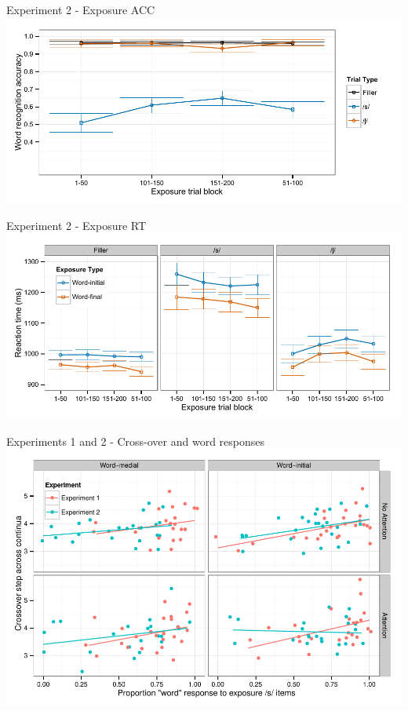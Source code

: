 \documentclass{beamer}
\begin{document}
\begin{frame}{Experiment 2 - Exposure ACC}
\includegraphics[width=1.0\textwidth]{graphs/exp2_expacc}
\end{frame}

\begin{frame}{Experiment 2 - Exposure RT}
\includegraphics[width=1.0\textwidth]{graphs/exp2_exprt}
\end{frame}



\begin{frame}{Experiments 1 and 2 - Cross-over and word responses}
\includegraphics[width=1.0\textwidth]{graphs/exp12_xoverwordresp}
\end{frame}
\end{document}
